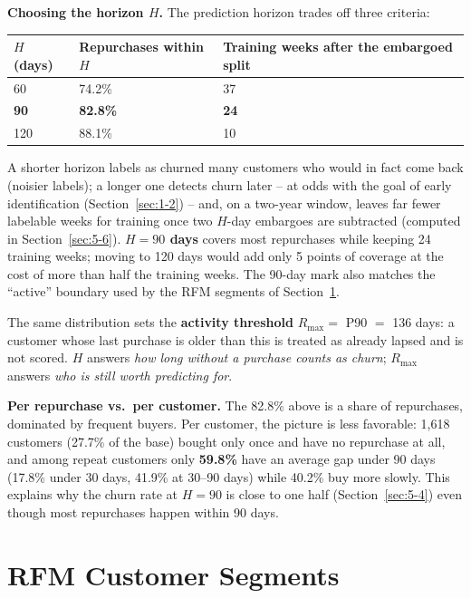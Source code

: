 \textbf{Choosing the horizon $H$.} The prediction horizon trades off three criteria:

\begin{center}
\begin{tabular}{@{}p{1.6cm}p{5cm}p{4.6cm}@{}}
    \toprule
    $H$ (days) & Repurchases within $H$ & Training weeks after the embargoed split \\
    \midrule
    60 & 74.2\% & 37 \\
    \textbf{90} & \textbf{82.8\%} & \textbf{24} \\
    120 & 88.1\% & 10 \\
    \bottomrule
\end{tabular}
\end{center}

A shorter horizon labels as churned many customers who would in fact come back (noisier labels); a longer one detects churn later -- at odds with the goal of early identification (Section~\ref{sec:1-2}) -- and, on a two-year window, leaves far fewer labelable weeks for training once two $H$-day embargoes are subtracted (computed in Section~\ref{sec:5-6}). \textbf{$H = 90$ days} covers most repurchases while keeping 24 training weeks; moving to 120 days would add only 5 points of coverage at the cost of more than half the training weeks. The 90-day mark also matches the ``active'' boundary used by the RFM segments of Section~\ref{sec:4-6}.

The same distribution sets the \textbf{activity threshold} $R_{\max} = $ P90 $=$ 136 days: a customer whose last purchase is older than this is treated as already lapsed and is not scored. $H$ answers \emph{how long without a purchase counts as churn}; $R_{\max}$ answers \emph{who is still worth predicting for}.

\textbf{Per repurchase vs.\ per customer.} The 82.8\% above is a share of repurchases, dominated by frequent buyers. Per customer, the picture is less favorable: 1,618 customers (27.7\% of the base) bought only once and have no repurchase at all, and among repeat customers only \textbf{59.8\%} have an average gap under 90 days (17.8\% under 30 days, 41.9\% at 30--90 days) while 40.2\% buy more slowly. This explains why the churn rate at $H = 90$ is close to one half (Section~\ref{sec:5-4}) even though most repurchases happen within 90 days.

\section{RFM Customer Segments}
\label{sec:4-6}

